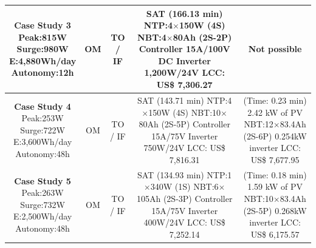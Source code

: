 \documentclass[review]{elsarticle}
\begin{document}
\begin{table}
\begin{scriptsize}
\begin{tabular}{|c|c|c|c|c|}
\hline
\makecell{\textbf{Case Study 3}\\Peak:815W\\Surge:980W\\E:4,880Wh/day\\Autonomy:12h} & OM & TO / IF & \makecell {SAT (166.13 min) \\NTP:4$\times$150W (4S)\\NBT:4$\times$80Ah (2S-2P)\\Controller 15A/100V DC\\Inverter 1,200W/24V \\LCC: US\$ 7,306.27} & Not possible \\
\hline
\makecell{\textbf{Case Study 4}\\Peak:253W\\Surge:722W\\E:3,600Wh/day\\Autonomy:48h} & OM & TO / IF & \makecell {SAT (143.71 min) \\NTP:4$\times$150W (4S)\\NBT:10$\times$80Ah (2S-5P)\\Controller 15A/75V\\Inverter 750W/24V \\LCC: US\$ 7,816.31} & \makecell{(Time: 0.23 min)\\2.42 kW of PV\\NBT:12$\times$83.4Ah (2S-6P)\\0.254kW inverter\\LCC: US\$ 7,677.95}\\
\hline
\makecell{\textbf{Case Study 5}\\Peak:263W\\Surge:732W\\E:2,500Wh/day\\Autonomy:48h} & OM & TO / IF & \makecell {SAT (134.93 min) \\NTP:1$\times$340W (1S)\\NBT:6$\times$105Ah (2S-3P)\\Controller 15A/75V\\Inverter 400W/24V \\LCC: US\$ 7,252.14} & \makecell{(Time: 0.18 min)\\1.59 kW of PV\\NBT:10$\times$83.4Ah (2S-5P)\\0.268kW inverter\\LCC: US\$ 6,175.57} \\
\hline

\end{tabular}
\end{scriptsize}
\end{table}
\end{document}
